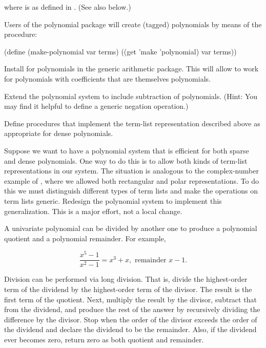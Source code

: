 \noindent
where  is as defined in .  (See also
 below.)

Users of the polynomial package will create (tagged) polynomials by means of
the procedure:

\begin{codeBlock}
(define (make-polynomial var terms)
  ((get 'make 'polynomial) var terms))
\end{codeBlock}

\begin{exerciseGroup}
\label{Exercise 2.87}
 Install  for
polynomials in the generic arithmetic package.  This will allow
 to work for polynomials with coefficients that are
themselves polynomials.

\label{Exercise 2.88}
 Extend the polynomial system to
include subtraction of polynomials.  (Hint: You may find it helpful to define a
generic negation operation.)

\label{Exercise 2.89}
 Define procedures that implement
the term-list representation described above as appropriate for dense
polynomials.

\label{Exercise 2.90}
 Suppose we want to have a
polynomial system that is efficient for both sparse and dense polynomials.  One
way to do this is to allow both kinds of term-list representations in our
system.  The situation is analogous to the complex-number example of
, where we allowed both rectangular and polar representations.  To do
this we must distinguish different types of term lists and make the operations
on term lists generic.  Redesign the polynomial system to implement this
generalization.  This is a major effort, not a local change.

\label{Exercise 2.91}
 A univariate polynomial can be
divided by another one to produce a polynomial quotient and a polynomial
remainder.  For example,

$$ \frac{x^5 - 1}{x^2 - 1} = x^3 + x, \text{ remainder } x - 1. $$

Division can be performed via long division.  That is, divide the highest-order
term of the dividend by the highest-order term of the divisor.  The result is
the first term of the quotient.  Next, multiply the result by the divisor,
subtract that from the dividend, and produce the rest of the answer by
recursively dividing the difference by the divisor.  Stop when the order of the
divisor exceeds the order of the dividend and declare the dividend to be the
remainder.  Also, if the dividend ever becomes zero, return zero as both
quotient and remainder.


\end{exerciseGroup}
